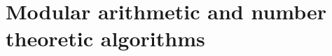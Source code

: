 \chapter{Modular arithmetic and number theoretic algorithms}
\label{chapter:number-theoretic-algorithms}





